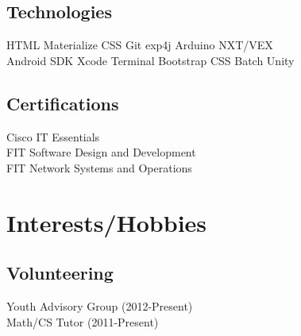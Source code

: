 \documentclass[]{deedy-resume-openfont}
\begin{document}
\begin{minipage}[t]{0.33\textwidth}
\subsection{Technologies}
HTML \textbullet{} Materialize CSS \textbullet{} Git  \textbullet{} exp4j \textbullet{} Arduino \textbullet{} NXT/VEX
\\ 
\vspace{1mm}
Android SDK \textbullet{} Xcode \textbullet{} Terminal \textbullet{}Bootstrap  \textbullet{} CSS \textbullet{} Batch \textbullet{} Unity

\sectionsep

\subsection{Certifications}
\textbullet{} Cisco IT Essentials\\
\textbullet{} FIT Software Design and Development \\
\textbullet{} FIT Network Systems and Operations \\
\sectionsep
\vspace{2mm}

\section{Interests/Hobbies}

\subsection{Volunteering}
\textbullet{} Youth Advisory Group (2012-Present)\\
\textbullet{} Math/CS Tutor (2011-Present)\\
\vspace{2mm}


\end{minipage}
\end{document}
